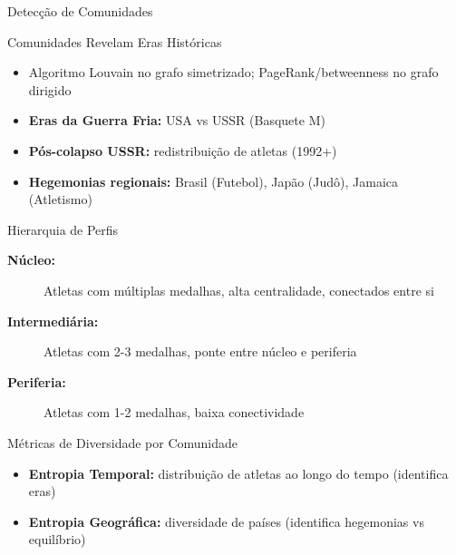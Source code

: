 \begin{frame}[shrink=7]{Detecção de Comunidades}
    \begin{block}{Comunidades Revelam Eras Históricas}
        \footnotesize
        \begin{itemize}
            \item Algoritmo Louvain no grafo simetrizado; PageRank/betweenness no grafo dirigido
            \item \textbf{Eras da Guerra Fria:} USA vs USSR (Basquete M)
            \item \textbf{Pós-colapso USSR:} redistribuição de atletas (1992+)
            \item \textbf{Hegemonias regionais:} Brasil (Futebol), Japão (Judô), Jamaica (Atletismo)
        \end{itemize}
    \end{block}

    \vspace{0.2cm}

    \begin{block}{Hierarquia de Perfis}
        \footnotesize
        \begin{description}
            \item[\textbf{Núcleo:}] Atletas com múltiplas medalhas, alta centralidade, conectados entre si
            \item[\textbf{Intermediária:}] Atletas com 2-3 medalhas, ponte entre núcleo e periferia
            \item[\textbf{Periferia:}] Atletas com 1-2 medalhas, baixa conectividade
        \end{description}
    \end{block}

    \vspace{0.2cm}

    \begin{block}{Métricas de Diversidade por Comunidade}
        \footnotesize
        \begin{itemize}
            \item \textbf{Entropia Temporal:} distribuição de atletas ao longo do tempo (identifica eras)
            \item \textbf{Entropia Geográfica:} diversidade de países (identifica hegemonias vs equilíbrio)
        \end{itemize}
    \end{block}
\end{frame}

